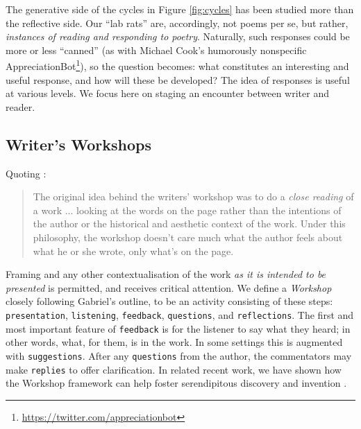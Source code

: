 The generative side of the cycles in Figure \ref{fig:cycles} has been studied more than the reflective side.
Our ``lab rats'' are, accordingly, not poems per se, but rather,
\emph{instances of reading and responding to poetry}.  Naturally, such responses could be more or less
``canned'' (as with Michael Cook's humorously nonspecific
AppreciationBot\footnote{\url{https://twitter.com/appreciationbot}}), so the question becomes: what constitutes an
interesting and useful response, and how will these be
developed?  The idea of responses is useful at various levels.
We focus here on staging an encounter between writer and reader.

\subsection{Writer's Workshops}

Quoting \cite[pp. 2--3]{gabriel2002writer}:

\begin{quote}
The original idea behind the writers' workshop was to do a \emph{close
  reading} of a work%
... looking at the words on the page rather than the
intentions of the author or the historical and aesthetic context of
the work.  Under this philosophy, the workshop doesn't care much what
the author feels about what he or she wrote, only what's on the page.
\end{quote}

Framing and any other contextualisation of the work \emph{as it is intended to be presented} is permitted, and receives critical attention.
We define a \emph{Workshop} closely following
Gabriel's outline, to be an activity consisting of these steps:
{\tt presentation}, {\tt listening}, {\tt feedback}, {\tt questions}, and 
 {\tt reflections}.  The first and most important feature of {\tt feedback} is
 for the listener to say what they heard; in other words, what, for them, is in the work.  In some
 settings this is augmented with {\tt suggestions}.  After any
 {\tt questions} from the author, the commentators may make {\tt replies} to offer clarification. 
In related recent work, we have shown how the Workshop framework 
can help foster serendipitous discovery and invention
\cite{serendipity-arxiv,feedback-arxiv}.


